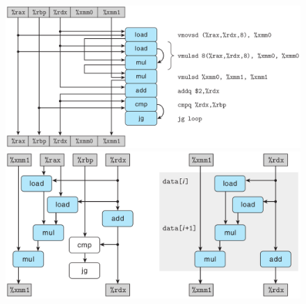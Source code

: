 \begin{figure}[!ht]
    \centering
    \begin{minipage}{0.65\textwidth}
        \centering
        \includegraphics[width=\textwidth]{img/5-11}
        \includegraphics[width=\textwidth]{img/5-12}
    \end{minipage}
    \begin{minipage}{0.33\textwidth}
        \centering

\end{minipage}
\end{figure}
